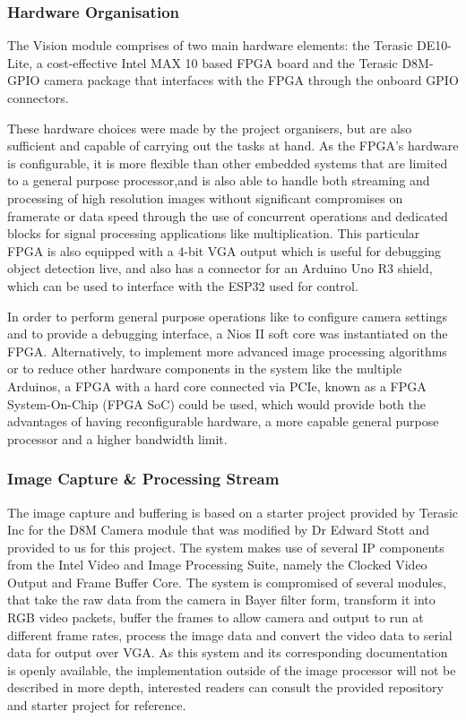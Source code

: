 \documentclass[a4paper]{article}
\begin{document}
\subsubsection{Hardware Organisation}

The Vision module comprises of two main hardware elements: 
    the Terasic DE10-Lite, a cost-effective Intel MAX 10 based FPGA board 
    \cite{TerasicDE10Web} 
    and the Terasic D8M-GPIO camera package \cite{TerasicD8MWeb}
that interfaces with the FPGA through the onboard GPIO connectors. 

These hardware choices were made by the project organisers, 
but are also sufficient and capable of carrying out the tasks at hand. 
As the FPGA's hardware is configurable, 
it is more flexible than other embedded systems 
that are limited to a general purpose processor,and 
is also able to handle both streaming and processing of high resolution images
without significant compromises on framerate or data speed 
through the use of concurrent operations and dedicated blocks 
for signal processing applications like multiplication.
This particular FPGA is also equipped with a 4-bit VGA output 
which is useful for debugging object detection live, 
and also has a connector for an Arduino Uno R3 shield, \cite{TerasicDE10Web} 
which can be used to interface with the ESP32 used for control.  

In order to perform general purpose operations like
    to configure camera settings
    and to provide a debugging interface,
a Nios II soft core was instantiated on the FPGA. 
Alternatively, to implement more advanced image processing algorithms
or to reduce other hardware components in the system like the multiple Arduinos, 
a FPGA with a hard core connected via PCIe, 
known as a FPGA System-On-Chip (FPGA SoC) \cite{FPGASoC} could be used, 
which would provide both the advantages of having reconfigurable hardware,
a more capable general purpose processor and a higher bandwidth limit. 

\subsubsection{Image Capture \& Processing Stream}

The image capture and buffering is based on a starter project provided
by Terasic Inc for the D8M Camera module that was modified by Dr Edward Stott 
\cite{EEE2Rover} and provided to us for this project. The system makes use of 
several IP components from the Intel Video and Image Processing Suite,
namely the Clocked Video Output and Frame Buffer Core. The system is compromised
of several modules, that take the raw data from the camera in Bayer filter form\cite{TerasicD8MWeb},
transform it into RGB video packets, buffer the frames to allow camera and output
to run at different frame rates, process the image data and convert the video 
data to serial data for output over VGA.\cite{EEE2Rover} As this system and its 
corresponding documentation is openly available, the implementation outside of 
the image processor will not be described in more depth, interested readers can 
consult the provided repository and starter project for reference. 
\end{document}
